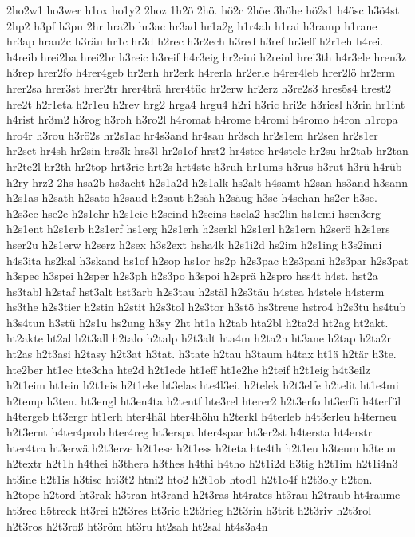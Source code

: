 {2ho2w1
ho3wer
h1ox
ho1y2
2hoz
1h2ö
2hö.
hö2c
2höe
3höhe
hö2s1
h4ösc
h3ö4st
2hp2
h3pf
h3pu
2hr
hra2b
hr3ac
hr3ad
hr1a2g
h1r4ah
h1rai
h3ramp
h1rane
hr3ap
hrau2c
h3räu
hr1c
hr3d
h2rec
h3r2ech
h3red
h3ref
hr3eff
h2r1eh
h4rei.
h4reib
hrei2ba
hrei2br
h3reic
h3reif
h4r3eig
hr2eini
h2reinl
hrei3th
h4r3ele
hren3z
h3rep
hrer2fo
h4rer4geb
hr2erh
hr2erk
h4rerla
hr2erle
h4rer4leb
hrer2lö
hr2erm
hrer2sa
hrer3st
hrer2tr
hrer4trä
hrer4tüc
hr2erw
hr2erz
h3re2s3
hres5s4
hrest2
hre2t
h2r1eta
h2r1eu
h2rev
hrg2
hrga4
hrgu4
h2ri
h3ric
hri2e
h3riesl
h3rin
hr1int
h4rist
hr3m2
h3rog
h3roh
h3ro2l
h4romat
h4rome
h4romi
h4romo
h4ron
h1ropa
hro4r
h3rou
h3rö2s
hr2s1ac
hr4s3and
hr4sau
hr3sch
hr2s1em
hr2sen
hr2s1er
hr2set
hr4sh
hr2sin
hrs3k
hrs3l
hr2s1of
hrst2
hr4stec
hr4stele
hr2su
hr2tab
hr2tan
hr2te2l
hr2th
hr2top
hrt3ric
hrt2s
hrt4ste
h3ruh
hr1ums
h3rus
h3rut
h3rü
h4rüb
h2ry
hrz2
2hs
hsa2b
hs3acht
h2s1a2d
h2s1alk
hs2alt
h4samt
h2san
hs3and
h3sann
h2s1as
h2sath
h2sato
h2saud
h2saut
h2säh
h2säug
h3sc
h4schan
hs2cr
h3se.
h2s3ec
hse2e
h2s1ehr
h2s1eie
h2seind
h2seins
hsela2
hse2lin
hs1emi
hsen3erg
h2s1ent
h2s1erb
h2s1erf
hs1erg
h2s1erh
h2serkl
h2s1erl
h2s1ern
h2serö
h2s1ers
hser2u
h2s1erw
h2serz
h2sex
h3s2ext
hsha4k
h2s1i2d
hs2im
h2s1ing
h3s2inni
h4s3ita
hs2kal
h3skand
hs1of
h2sop
hs1or
hs2p
h2s3pac
h2s3pani
h2s3par
h2s3pat
h3spec
h3spei
h2sper
h2s3ph
h2s3po
h3spoi
h2sprä
h2spro
hss4t
h4st.
hst2a
hs3tabl
h2staf
hst3alt
hst3arb
h2s3tau
h2stäl
h2s3täu
h4stea
h4stele
h4sterm
hs3the
h2s3tier
h2stin
h2stit
h2s3tol
h2s3tor
h3stö
hs3treue
hstro4
h2s3tu
hs4tub
h3s4tun
h3stü
h2s1u
hs2ung
h3sy
2ht
ht1a
h2tab
hta2bl
h2ta2d
ht2ag
ht2akt.
ht2akte
ht2al
h2t3all
h2talo
h2talp
h2t3alt
hta4m
h2ta2n
ht3ane
h2tap
h2ta2r
ht2as
h2t3asi
h2tasy
h2t3at
h3tat.
h3tate
h2tau
h3taum
h4tax
ht1ä
h2tär
h3te.
hte2ber
ht1ec
hte3cha
hte2d
h2t1ede
ht1eff
ht1e2he
h2teif
h2t1eig
h4t3eilz
h2t1eim
ht1ein
h2t1eis
h2t1eke
ht3elas
hte4l3ei.
h2telek
h2t3elfe
h2telit
ht1e4mi
h2temp
h3ten.
ht3engl
ht3en4ta
h2tentf
hte3rel
hterer2
h2t3erfo
ht3erfü
h4terfül
h4tergeb
ht3ergr
ht1erh
hter4häl
hter4höhu
h2terkl
h4terleb
h4t3erleu
h4terneu
h2t3ernt
h4ter4prob
hter4reg
ht3erspa
hter4spar
ht3er2st
h4tersta
ht4erstr
hter4tra
ht3erwä
h2t3erze
h2t1ese
h2t1ess
h2teta
hte4th
h2t1eu
h3teum
h3teun
h2textr
h2t1h
h4thei
h3thera
h3thes
h4thi
h4tho
h2t1i2d
h3tig
h2t1im
h2t1i4n3
ht3ine
h2t1is
h3tisc
hti3t2
htni2
hto2
h2t1ob
htod1
h2t1o4f
h2t3oly
h2ton.
h2tope
h2tord
ht3rak
h3tran
ht3rand
h2t3ras
ht4rates
ht3rau
h2traub
ht4raume
ht3rec
h5treck
ht3rei
h2t3res
ht3ric
h2t3rieg
h2t3rin
h3trit
h2t3riv
h2t3rol
h2t3ros
h2t3roß
ht3röm
ht3ru
ht2sah
ht2sal
ht4s3a4n
}
